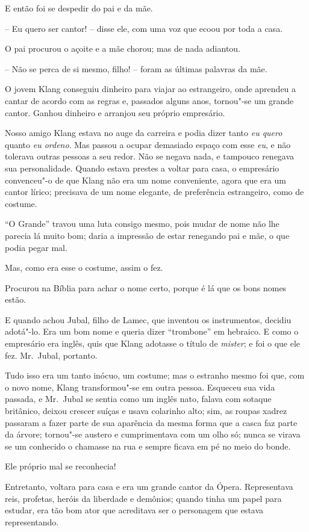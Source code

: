 E então foi se despedir do pai e da mãe.

-- Eu quero ser cantor! -- disse ele, com uma voz que ecoou por toda a
casa.

O pai procurou o açoite e a mãe chorou; mas de nada adiantou.

-- Não se perca de si mesmo, filho! -- foram as últimas palavras da mãe.
\asterisc

O jovem Klang conseguiu dinheiro para viajar ao estrangeiro, onde
aprendeu a cantar de acordo com as regras e, passados alguns anos,
tornou"-se um grande cantor. Ganhou dinheiro e arranjou seu próprio
empresário.

Nosso amigo Klang estava no auge da carreira e podia dizer tanto \textit{eu
quero} quanto \textit{eu ordeno}. Mas passou a ocupar demasiado espaço com
esse \textit{eu}, e não tolerava outras pessoas a seu redor. Não se negava
nada, e tampouco renegava sua personalidade. Quando estava prestes a
voltar para casa, o empresário convenceu"-o de que Klang não era um
nome conveniente, agora que era um cantor lírico; precisava de um nome
elegante, de preferência estrangeiro, como de costume.

``O Grande'' travou uma luta consigo mesmo, pois mudar de nome não lhe
parecia lá muito bom; daria a impressão de estar renegando pai e mãe, o
que podia pegar mal.

Mas, como era esse o costume, assim o fez. 

Procurou na Bíblia para achar o nome certo, porque é lá que os bons
nomes estão.

E quando achou Jubal, filho de Lamec, que inventou os instrumentos,
decidiu adotá"-lo. Era um bom nome e queria dizer ``trombone'' em
hebraico. E como o empresário era inglês, quis que Klang adotasse o
título de \textit{mister}; e foi o que ele fez. Mr.~Jubal, portanto.

Tudo isso era um tanto inócuo, um costume; mas o estranho mesmo foi que,
com o novo nome, Klang transformou"-se em outra pessoa. Esqueceu sua
vida passada, e Mr.~Jubal se sentia como um inglês nato, falava com
sotaque britânico, deixou crescer suíças e usava colarinho alto; sim,
as roupas xadrez passaram a fazer parte de sua aparência da mesma forma
que a casca faz parte da árvore; tornou"-se austero e cumprimentava
com um olho só; nunca se virava se um conhecido o chamasse na rua e
sempre ficava em pé no meio do bonde.

Ele próprio mal se reconhecia!

Entretanto, voltara para casa e era um grande cantor da Ópera. 
Representava reis, profetas, heróis da liberdade e demônios; quando
tinha um papel para estudar, era tão bom ator que acreditava ser o
personagem que estava representando.

